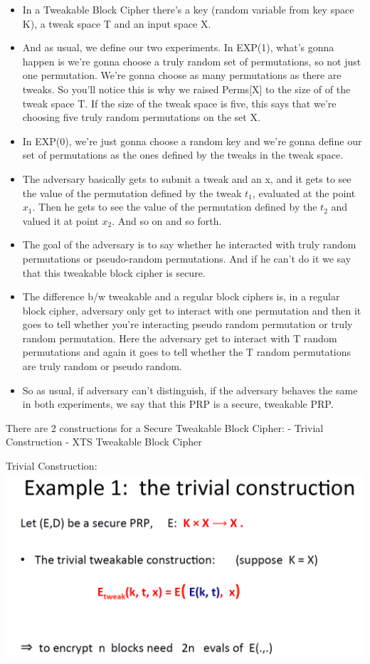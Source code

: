 \documentclass[11pt]{article}
\makeatletter
\def\maxwidth{\ifdim\Gin@nat@width>\linewidth\linewidth
    \else\Gin@nat@width\fi}
\let\Oldincludegraphics\includegraphics
\renewcommand{\includegraphics}[1]{\Oldincludegraphics[width=.8\maxwidth]{#1}}
\providecommand{\tightlist}{%
      \setlength{\itemsep}{0pt}\setlength{\parskip}{0pt}}
\makeatother
\begin{document}
\begin{itemize}
\tightlist
\item
  In a Tweakable Block Cipher there's a key (random variable from key
  space K), a tweak space T and an input space X. 
\item
  And as usual, we define our two experiments. In EXP(1), what's gonna
  happen is we're gonna choose a truly random set of permutations, so
  not just one permutation. We're gonna choose as many permutations as
  there are tweaks. So you'll notice this is why we raised Perms{[}X{]}
  to the size of of the tweak space \textbar{}T\textbar{}. If the size
  of the tweak space is five, this says that we're choosing five truly
  random permutations on the set X. 
\item
  In EXP(0), we're just gonna choose a random key and we're gonna define
  our set of permutations as the ones defined by the tweaks in the tweak
  space. 
\item
  The adversary basically gets to submit a tweak and an x, and it gets
  to see the value of the permutation defined by the tweak \(t_{1}\),
  evaluated at the point \(x_{1}\). Then he gets to see the value of the
  permutation defined by the \(t_{2}\) and valued it at point \(x_{2}\).
  And so on and so forth. 
\item
  The goal of the adversary is to say whether he interacted with truly
  random permutations or pseudo-random permutations. And if he can't do
  it we say that this tweakable block cipher is secure.
\item
  The difference b/w tweakable and a regular block ciphers is, in a
  regular block cipher, adversary only get to interact with one
  permutation and then it goes to tell whether you're interacting pseudo
  random permutation or truly random permutation. Here the adversary get
  to interact with T random permutations and again it goes to tell
  whether the T random permutations are truly random or pseudo random. 
\item
  So as usual, if adversary can't distinguish, if the adversary behaves
  the same in both experiments, we say that this PRP is a secure,
  tweakable PRP.
\end{itemize}

There are 2 constructions for a Secure Tweakable Block Cipher: - Trivial
Construction - XTS Tweakable Block Cipher

Trivial Construction: \includegraphics{./Images/TrivialTBC.png}
\end{document}

